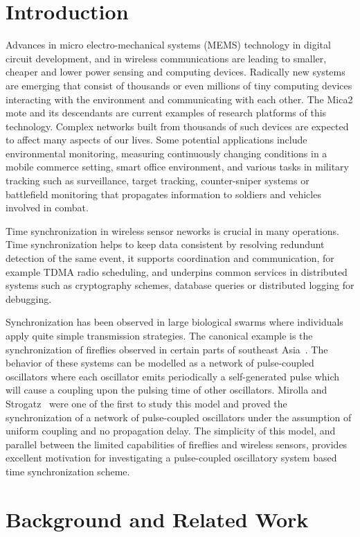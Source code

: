 \documentclass[8pt,twocolumn]{article}
\begin{document}
\section{Introduction}

Advances in micro electro-mechanical systems (MEMS) technology in digital
circuit development, and in wireless communications are leading to smaller,
cheaper and lower power sensing and computing devices.  Radically new systems
are emerging that consist of thousands or even millions of tiny computing
devices interacting with the environment and communicating with each other.
The Mica2 mote and its descendants are current examples of research platforms
of this technology. Complex networks built from thousands of such devices are
expected to affect many aspects of our lives.  Some potential applications
include environmental monitoring, measuring continuously changing conditions
in a mobile commerce setting, smart office environment, and various tasks in
military tracking such as surveillance, target tracking, counter-sniper
systems or battlefield monitoring that propagates information to soldiers and
vehicles involved in combat.

Time synchronization in wireless sensor neworks is crucial in many
operations.  Time synchronization helps to keep data consistent by resolving
redundunt detection of the same event, it supports coordination and
communication, for example TDMA radio scheduling, and underpins common
services in distributed systems such as cryptography schemes, database
queries or distributed logging for debugging.  

Synchronization has been observed in large biological swarms where
individuals apply quite simple transmission strategies. The canonical example
is the synchronization of fireflies observed in certain parts of southeast
Asia~\cite{ms90}.  The behavior of these systems can be modelled as a network
of pulse-coupled oscillators where each oscillator emits periodically a
self-generated pulse which will cause a coupling upon the pulsing time of
other oscillators. Mirolla and Strogatz~\cite{ms90} were one of the first to
study this model and proved the synchronization of a network of pulse-coupled
oscillators under the assumption of uniform coupling and no propagation
delay.  The simplicity of this model, and parallel between the limited
capabilities of fireflies and wireless sensors, provides excellent motivation
for investigating a pulse-coupled oscillatory system based time
synchronization scheme.

\section{Background and Related Work}
\end{document}
